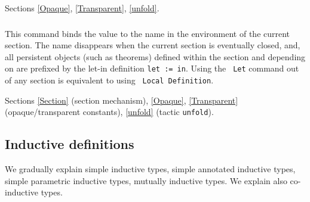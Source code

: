 \begin{ErrMsgs}
\item {}
\end{ErrMsgs}

\SeeAlso Sections \ref{Opaque}, \ref{Transparent}, \ref{unfold}.

\subsubsection{}

This command binds the value {\term} to the name {\ident} in the
environment of the current section. The name {\ident} disappears
when the current section is eventually closed, and, all
persistent objects (such as theorems) defined within the
section and depending on {\ident} are prefixed by the let-in definition
{\tt let {\ident} := {\term} in}. Using the {\tt
Let} command out of any section is equivalent to using {\tt
Local Definition}.

\begin{ErrMsgs}
\item {}
\end{ErrMsgs}

\begin{Variants}
\item {}
\item {}
\item {}
\end{Variants}

\SeeAlso Sections \ref{Section} (section mechanism), \ref{Opaque},
\ref{Transparent} (opaque/transparent constants), \ref{unfold} (tactic
    {\tt unfold}).

\subsection{Inductive definitions
\label{gal-Inductive-Definitions}
\label{Inductive}
\label{Variant}}

We gradually explain simple inductive types, simple
annotated inductive types, simple parametric inductive types, 
mutually inductive types. We explain also co-inductive types.

